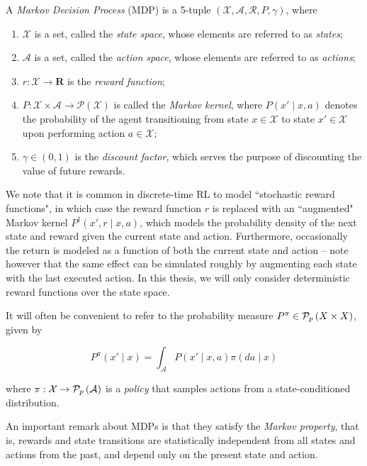 \begin{definition}
  A \emph{Markov Decision Process} (MDP) is a 5-tuple $(\mathcal{X},
  \mathcal{A}, \mathcal{R}, P, \gamma)$, where
  \begin{enumerate}
  \item $\mathcal{X}$ is a set, called the \emph{state space}, whose
    elements are referred to as \emph{states};
  \item $\mathcal{A}$ is a set, called the \emph{action space}, whose
    elements are referred to as \emph{actions};
  \item $r: \mathcal{X}\to\mathbf{R}$ is
    the \emph{reward function};
  \item $P: \mathcal{X}\times\mathcal{A}\to\mathscr{P}(\mathcal{X})$
    is called the \emph{Markov kernel}, where $P(x'\mid x, a)$ denotes
    the probability of the agent transitioning from state
    $x\in\mathcal{X}$ to state $x'\in\mathcal{X}$ upon performing
    action $a\in\mathcal{X}$;
  \item $\gamma\in(0,1)$ is the \emph{discount factor}, which serves
    the purpose of discounting the value of future rewards.
  \end{enumerate}
\end{definition}

We note that it is common in discrete-time RL to model ``stochastic reward
functions", in which case the reward function $r$ is replaced with an
``augmented" Markov kernel $P^\dagger(x', r\mid x, a)$, which models the
probability density of the next state and reward given the current state and
action. Furthermore, occasionally the return is modeled as a function of both
the current state and action -- note however that the same effect can be
simulated roughly by augmenting each state with the last executed action.
In this thesis, we will only consider deterministic reward functions over the
state space.

It will often be convenient to refer to the probability measure
$P^\pi\in\mathcal{P}_{p}\left(X\times X\right)$, given by

\begin{equation}
  \label{eq:p-pi}
  P^\pi(x'\mid x) = \int_{\mathcal{A}}P(x'\mid x, a)\pi(da\mid x)
\end{equation}

where $\pi:\mathcal{X}\to\mathcal{P}_{p}\left(\mathcal{A}\right)$ is a \emph{policy}
that samples actions from a state-conditioned distribution.

An important remark about MDPs is that they satisfy the \emph{Markov
  property}, that is, rewards and state transitions are statistically
independent from all states and actions from the past, and depend only
on the present state and action.

